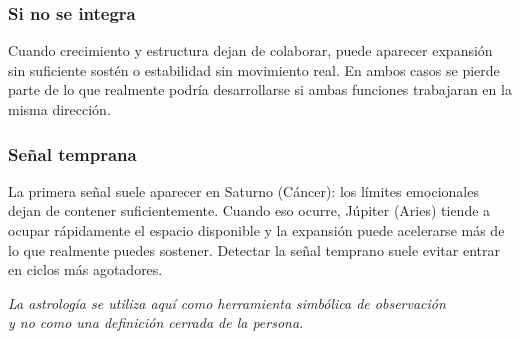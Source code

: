 \documentclass[11pt,a4paper]{article}
\begin{document}
\subsubsection*{Si no se integra}

Cuando crecimiento y estructura dejan de colaborar, puede aparecer expansión sin suficiente sostén o estabilidad sin movimiento real. En ambos casos se pierde parte de lo que realmente podría desarrollarse si ambas funciones trabajaran en la misma dirección.

\subsubsection*{Señal temprana}

La primera señal suele aparecer en Saturno (Cáncer): los límites emocionales dejan de contener suficientemente. Cuando eso ocurre, Júpiter (Aries) tiende a ocupar rápidamente el espacio disponible y la expansión puede acelerarse más de lo que realmente puedes sostener. Detectar la señal temprano suele evitar entrar en ciclos más agotadores.

\vfill

\begin{center}
{\small\itshape\color{grisai}
La astrología se utiliza aquí como herramienta simbólica de observación\\
y no como una definición cerrada de la persona.
}
\end{center}
\end{document}
